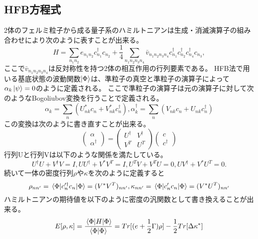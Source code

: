 \documentclass[12pt]{jarticle}
\begin{document}
\subsection{HFB方程式}
2体のフェルミ粒子から成る量子系のハミルトニアンは生成・消滅演算子の組み合わせにより次のように表すことが出来る。
\begin{equation}
    H = \sum_{n_1 n_2} e_{n_1 n_2}c_{n_1}^\dagger c_{n_2} + \frac{1}{4} \sum_{n_1 n_2 n_3 n_4}\bar{v}_{n_1 n_2 n_3 n_4}c_{n_1}^\dagger c_{n_2}^\dagger c_{n_4}^\dagger c_{n_3},
\end{equation}
ここで$\bar{v}_{n_1 n_2 n_3 n_4}$は反対称性を持つ2体の相互作用の行列要素である。
HFB法で用いる基底状態の波動関数$\ket{\Phi}$は、準粒子の真空と準粒子の演算子によって$\alpha_k\ket{\psi} = 0$のように定義される。
ここで準粒子の演算子は元の演算子に対して次のようなBogoliubov変換を行うことで定義される。
\begin{equation}
    \alpha_k = \sum_n(U_{nk}^*c_n + V_{nk}^* c_n^\dagger ), \alpha_k^\dagger  = \sum_n(V_{nk}c_n + U_{nk} c_n^\dagger )
\end{equation}
この変換は次のように書き直すことが出来る。
\begin{equation}
    \left(\begin{array}{c}
            \alpha \\
            \alpha^\dagger
        \end{array}
    \right) =
    \begin{pmatrix}
        U^\dagger& V^\dagger\\
        V^T & U^T
    \end{pmatrix}
    \left(\begin{array}{c}
            c \\
            c^\dagger
        \end{array}
    \right)
\end{equation}
行列Uと行列Vは以下のような関係を満たしている。
\begin{equation}
    U^\dagger U + V^\dagger V = I, UU^\dagger  + V^*V^T = I, U^{T}V + V^{T}U = 0, UV^\dagger  + V^*U^T = 0. 
\end{equation}
続いて一体の密度行列$\rho$や$\kappa$を次のように定義すると
\begin{equation}
    \label{rho-kappa}
    \rho_{nn'} = \mel{\Phi}{c_n'^\dagger c_n}{\Phi} = (V^*V^T)_{nn'}, \kappa_{nn'} = \mel{\Phi}{c_n'c_n}{\Phi} = (V^*U^T)_{nn'}
\end{equation}
ハミルトニアンの期待値を以下のように密度の汎関数として書き換えることが出来る。
\begin{equation}
    \label{func-energy}
    E[\rho,\kappa] = \frac{\mel{\Phi}{H}{\Phi}}{\braket{\Phi}{\Phi}} = Tr[(e + \frac{1}{2}\Gamma)\rho] - \frac{1}{2}Tr[\Delta\kappa^*]
\end{equation}
\end{document}
